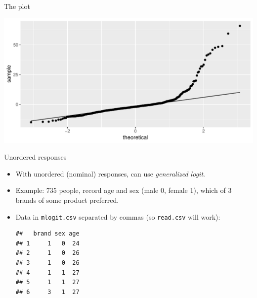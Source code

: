 \begin{frame}[fragile]{The plot}
  
\begin{knitrout}
\color{fgcolor}\begin{kframe}
\begin{alltt}
\end{alltt}
\end{kframe}
\includegraphics[width=\maxwidth]{figure/unnamed-chunk-29-1} 

\end{knitrout}
  
\end{frame}





\begin{frame}[fragile]{Unordered responses}

  \begin{itemize}
  \item With unordered (nominal) responses, can use {\em generalized logit}.
  \item Example: 735 people, record age and sex (male 0, female 1), which of 3 brands of some product preferred.
  \item Data in \verb-mlogit.csv- separated by commas (so
    \texttt{read.csv} will work):

 
\begin{knitrout}
\color{fgcolor}\begin{kframe}
\begin{alltt}
\hlkwb{=}\hlstd{(}\hlstd{,}
\end{alltt}
\begin{verbatim}
##   brand sex age
## 1     1   0  24
## 2     1   0  26
## 3     1   0  26
## 4     1   1  27
## 5     1   1  27
## 6     3   1  27
\end{verbatim}
\end{kframe}
\end{knitrout}
    

  \end{itemize}

\end{frame}

